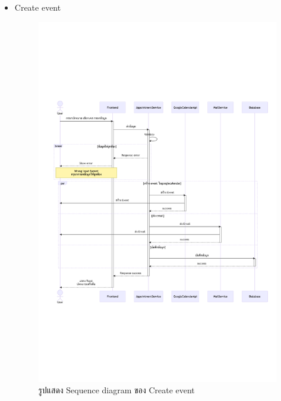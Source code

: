 \documentclass[12pt,oneside,openright,a4paper]{cpe-thai-project}
\begin{document}
\begin{itemize}
    \newpage
    \item Create event \\
    \begin{figure}[!ht]\centering
        \includegraphics[width=13cm, trim={0 7cm 0 7cm},clip]{./assets/sequence-diagram/create-event.png}
        \caption{รูปแสดง Sequence diagram ของ Create event}\label{fig:sqCraeteEvent}
    \end{figure}


\end{itemize}
\end{document}
